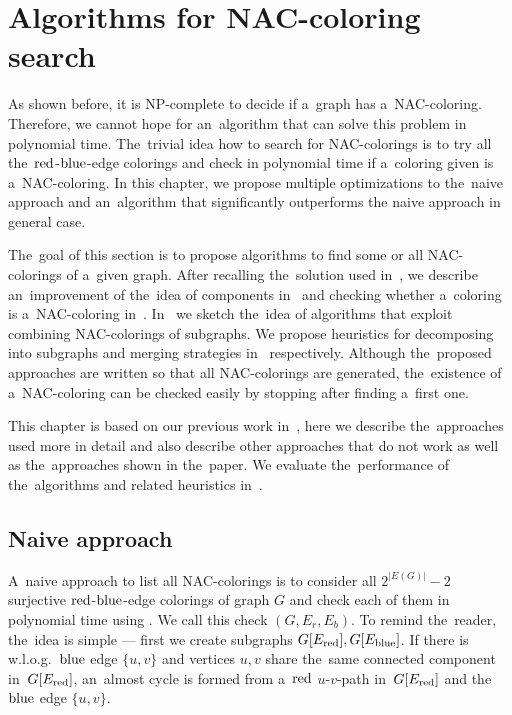 \chapter{Algorithms for NAC-coloring search}%
\label{chapter:algo}

\begin{chapterabstract}

	As shown before, it is NP-complete to decide if a~graph has a~NAC-coloring.
	Therefore, we cannot hope for an~algorithm that can solve this problem in polynomial time.
	The~trivial idea how to search for NAC-colorings is to
	try all the~\( \text{red} \)-\( \text{blue} \)-edge colorings
	and check in polynomial time if a~coloring given is a~NAC-coloring.
	In this chapter, we propose multiple optimizations to the~naive approach
	and an~algorithm that significantly outperforms the naive approach in general case.

\end{chapterabstract}

The~goal of this section is to propose algorithms to find some or all NAC-colorings of a~given graph.
After recalling the~solution used in~\flexrilog{},
we describe an~improvement of the~idea of \trcon{} components in~
and checking whether a~coloring is a~NAC-coloring in~.
In~ we sketch the~idea of algorithms that
exploit combining NAC-colorings of subgraphs.
We propose heuristics for decomposing into subgraphs and merging strategies
in~ respectively.
Although the~proposed approaches are written so that all NAC-colorings are generated,
the~existence of a~NAC-coloring can be checked easily by stopping after finding a~first one.

This chapter is based on our previous work in~\cite{my_paper},
here we describe the~approaches used more in detail
and also describe other approaches that do not work as well as the~approaches
shown in the~paper. We evaluate the~performance
of the~algorithms and related heuristics in~.

\section{Naive approach}

A~naive approach to list all NAC-colorings is to consider
all $2^{|E(G)|} - 2$ surjective \( \text{red} \)-\( \text{blue} \)-edge colorings of graph $G$
and check each of them in polynomial time using .
We call this check \IsNACColoring{}$(G, E_r, E_b)$.
To remind the~reader, the~idea is simple
--- first we create subgraphs \( G[E_{\text{red}}], G[E_{\text{blue}}] \).
If there is w.l.o.g.\ \( \text{blue} \) edge \( \{u, v\} \)
and vertices \( u, v \) share the~same connected component in~\( G[E_{\text{red}}] \),
an~almost cycle is formed from a~\( \text{red} \) \( u \)-\( v \)-path in~\( G[E_{\text{red}}] \)
and the~\( \text{blue} \) edge \( \{u, v\} \).

